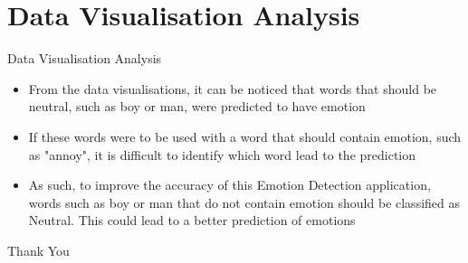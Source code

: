 \documentclass{beamer}
\begin{document}
\section{Data Visualisation Analysis}
\begin{frame}{Data Visualisation Analysis}
\begin{itemize}
\item From the data visualisations, it can be noticed that words that should be neutral, such as boy or man, were predicted to have emotion 
\item If these words were to be used with a word that should contain emotion, such as "annoy", it is difficult to identify which word lead to the prediction
\item As such, to improve the accuracy of this Emotion Detection application, words such as boy or man that do not contain emotion should be classified as Neutral. This could lead to a better prediction of emotions
\end{itemize}
\end{frame}

\begin{frame}
\Huge{\centerline{Thank You}}
\end{frame}
\end{document}
